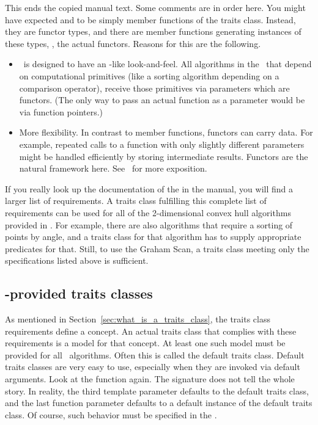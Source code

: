 This ends the copied manual text.  Some comments are in order here.
You might have expected  and  to be
simply member functions of the traits class.
 Instead, they are functor types, and
there are member functions generating instances of these types, \ie,
the actual functors. Reasons for this are the following.
\begin{itemize}
\item \cgal\ is designed to have an \stl-like look-and-feel.  All
  algorithms in the \stl\ that depend on computational primitives
  (like a sorting algorithm depending on a comparison operator),
  receive those primitives via parameters which are functors. (The
  only way to pass an actual function as a parameter would be via
  function pointers.)
\item More flexibility. In contrast to member functions, functors can
  carry data. For example, repeated calls to a function with only
  slightly different parameters might be handled efficiently by
  storing intermediate results. Functors are the natural framework
  here. See~\cite{hhkps-aegk-01} for more exposition.
\end{itemize}
If you really look up the documentation of the 
 in the manual, you will find a larger
list of requirements. 
A traits class fulfilling this complete list of requirements can be used
for all of the 2-dimensional convex hull algorithms provided in \cgal. 
For example, there are also
algorithms that require a sorting of points by angle, and a traits class for
that algorithm has to supply appropriate predicates for that. Still, to use
the Graham Scan, a traits class meeting only the specifications listed above
is sufficient.

\subsection{\cgal-provided traits classes\label{subsec:cgal_traits_classes}}

As mentioned in Section~\ref{sec:what_is_a_traits_class},
the traits class requirements define a concept. An
actual traits class that complies with these requirements is a model for
that concept. At least one such model must be provided for all \cgal\ 
algorithms.
Often this is called the default traits class.%
Default traits classes are very
easy to use, especially when they are invoked via default arguments.
Look at the function  
again. The signature does not
tell the whole story. In reality, the third template parameter defaults
to the default traits class, and the last function parameter defaults to
a default instance of the default traits class. Of course, such behavior
must be specified in the .
\ccIndexSubitem{documentation}{of default traits class}

